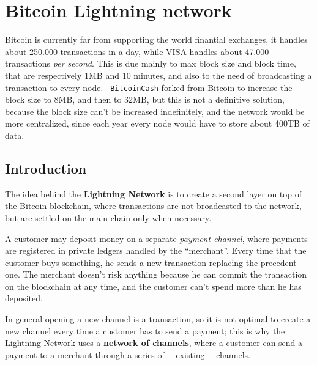 \chapter{Bitcoin Lightning network}

Bitcoin is currently far from supporting the world finantial exchanges, it handles about 250.000 transactions in a day, while VISA handles about 47.000 transactions \textit{per second}.
This is due mainly to max block size and block time, that are respectively 1MB and 10 minutes, and also to the need of broadcasting a transaction to every node.
\texttt{
BitcoinCash} forked from Bitcoin to increase the block size to 8MB, and then to 32MB, but this is not a definitive solution, because the block size can't be increased indefinitely, and the network would be more centralized, since each year every node would have to store about 400TB of data.

\section{Introduction}
The idea behind the \textbf{Lightning Network} is to create a second layer on top of the Bitcoin blockchain, where transactions are not broadcasted to the network, but are settled on the main chain only when necessary.

A customer may deposit money on a separate \textit{payment channel}, where payments are registered in private ledgers handled by the ``merchant''.
Every time that the customer buys something, he sends a new transaction replacing the precedent one.
The merchant doesn't risk anything because he can commit the transaction on the blockchain at any time, and the customer can't spend more than he has deposited.

In general opening a new channel is a transaction, so it is not optimal to create a new channel every time a customer has to send a payment; this is why the Lightning Network uses a \textbf{network of channels}, where a customer can send a payment to a merchant through a series of ---existing--- channels.

